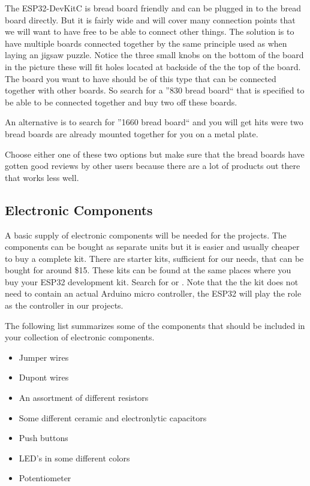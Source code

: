 \documentclass{tufte-book}
\begin{document}
The ESP32-DevKitC is bread board friendly and can be plugged in to the bread board directly. But it is fairly wide and will cover many connection points that we will want to have free to be able to connect other things. The solution is to have multiple boards connected together by the same principle used as when laying an jigsaw puzzle. Notice the three small knobs on the bottom of the board in the picture these will fit holes located at backside of the the top of the board. The board you want to have should be of this type that can be connected together with other boards. So search for a ''830 bread board`` that is specified to be able to be connected together and buy two off these boards. 

An alternative is to search for ''1660 bread board`` and you will get hits were two bread boards are already mounted together for you on a metal plate.

Choose either one of these two options but make sure that the bread boards have gotten good reviews by other users because there are a lot of products out there that works less well. 

\subsection{Electronic Components}
A basic supply of electronic components will be needed for the projects. The components can be bought as separate units but it is easier and usually cheaper to buy a complete kit. There are starter kits, sufficient for our needs, that can be bought for around \$15. These kits can be found at the same places where you buy your ESP32 development kit. Search for  or . Note that the the kit does not need to contain an actual Arduino micro controller, the ESP32 will play the role as the controller in our projects.

The following list summarizes some of the components that should be included in your collection of electronic components.

\begin{itemize}
	\item Jumper wires
	\item Dupont wires
	\item An assortment of different resistors
	\item Some different ceramic and electronlytic capacitors
	\item Push buttons
	\item LED's in some different colors 
	\item Potentiometer
\end{itemize}
\end{document}
